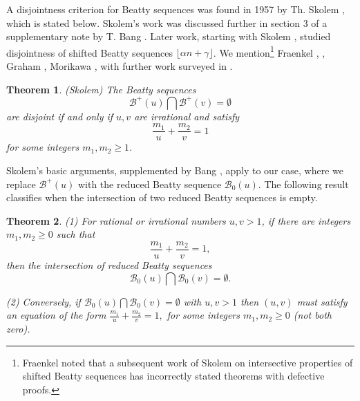 \documentclass[12pt,letterpaper, reqno]{amsart}
\newtheorem{thm}{Theorem}[section]
\theoremstyle{definition}
\theoremstyle{remark}
\newcommand{\sB}{{\mathcal B}}
\begin{document}
A disjointness  criterion for  Beatty
sequences was found in 1957 by Th. Skolem \cite[Theorem 8]{Sko57},
which is stated below.  
Skolem's work was discussed
further in  section 3  of a
supplementary note by T. Bang \cite{Ban57}. Later work,
starting with Skolem \cite{Sko57b},  studied disjointness of shifted Beatty 
sequences $\lfloor \alpha n + \gamma\rfloor$.
We mention\footnote{Fraenkel \cite{Fra69} noted that 
a subsequent work of Skolem \cite{Sko57b} on intersective properties of shifted Beatty sequences
has incorrectly stated theorems with defective proofs.} Fraenkel \cite{Fra69}, \cite{Fra73} , Graham \cite{Gr70}, Morikawa \cite{Mor85}, 
with further work surveyed in \cite{OB03}.  


\begin{thm} \label{thm:47} {\em (Skolem)}
The Beatty sequences 
\[ \sB^{+}(u) \bigcap \sB^{+}(v)= \emptyset \]
are disjoint
 if and only if $u,v$ are irrational and satisfy 
\[
 \frac{m_1}{u} + \frac{m_2}{v} =1
 \]
for some integers $m_1, m_2 \ge 1$.
\end{thm}
 
 Skolem's basic arguments, supplemented by Bang \cite[Sect. 5]{Ban57}, apply to
our case, where we replace $\sB^{+}(u)$ with the reduced Beatty sequence $\sB_0(u)$. 
%
%
The following result classifies when the intersection of two reduced Beatty sequences
is empty.

 
\begin{thm} \label{thm:49a} 
 (1) For rational or irrational numbers $u, v>1$, 
 if there are integers $m_1, m_2 \ge 0$ such that
 $$
 \frac{m_1}{u} + \frac{m_2}{v} =1,
 $$
then the intersection of reduced Beatty sequences 
$$\sB_0(u) \bigcap \sB_0(v)= \emptyset.$$

(2) Conversely, if $\sB_0(u) \bigcap \sB_0(v)= \emptyset$ with $u, v>1$ 
  then $(u, v)$ must
satisfy an equation of the  form 
$ \frac{m_1}{u} + \frac{m_2}{v} =1,$
for some integers $m_1,m_2 \ge 0$ (not both zero).  
 \end{thm}
\end{document}
